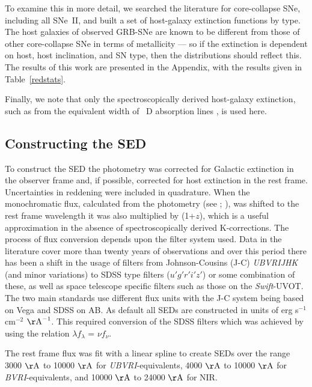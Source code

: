 \documentclass[a4paper,fleqn,usenatbib]{mnras}
\begin{document}
To examine this in more detail, we searched the literature for core-collapse SNe, including all SNe~II, and built a set of host-galaxy extinction functions by type. The host galaxies of observed GRB-SNe are known to be different from those of other core-collapse SNe in terms of metallicity \citep[e.g.,][]{Modjaz2008,GF2012} --- so if the extinction is dependent on host, host inclination, and SN type, then the distributions should reflect this. The results of this work are presented in the Appendix, with the results given in Table~\ref{redstats}. 

Finally, we note that only the spectroscopically derived host-galaxy extinction, such as from the equivalent width of ~D absorption lines \citep{Poznanski2012}, is used here.


\subsection{Constructing the SED}

To construct the SED the photometry was corrected for Galactic extinction in the observer frame and, if possible, corrected for host extinction in the rest frame. Uncertainties in reddening were included in quadrature. When the monochromatic flux, calculated from the photometry (see \citealt{BCP1998}; \citealt{Fukugita1995}), was shifted to the rest frame wavelength it was also multiplied by (1+$z$), which is a useful approximation in the absence of spectroscopically derived K-corrections. The process of flux conversion depends upon the filter system used. Data in the literature cover more than twenty years of observations and over this period there has been a shift in the usage of filters from Johnson-Cousins (J-C) \textit{UBVRIJHK} (and minor variations) to SDSS type filters ($u'g'r'i'z'$) or some combination of these, as well as space telescope specific filters such as those on the \textit{Swift}-UVOT. The two main standards use different flux units with the J-C system being based on Vega and SDSS on AB. As default all SEDs are constructed in units of erg s$^{-1}$ cm$^{-2}$ $\mathrm{\AA}^{-1}$. This required conversion of the SDSS filters which was achieved by using the relation $\lambda f_\lambda$ = $\nu f_\nu$.

The rest frame flux was fit with a linear spline to create SEDs over the range 3000 $\mathrm{\AA}$ to 10000 $\mathrm{\AA}$ for \textit{UBVRI}-equivalents, 4000 $\mathrm{\AA}$ to 10000 $\mathrm{\AA}$ for \textit{BVRI}-equivalents, and 10000 $\mathrm{\AA}$  to 24000 $\mathrm{\AA}$ for NIR.
\end{document}
